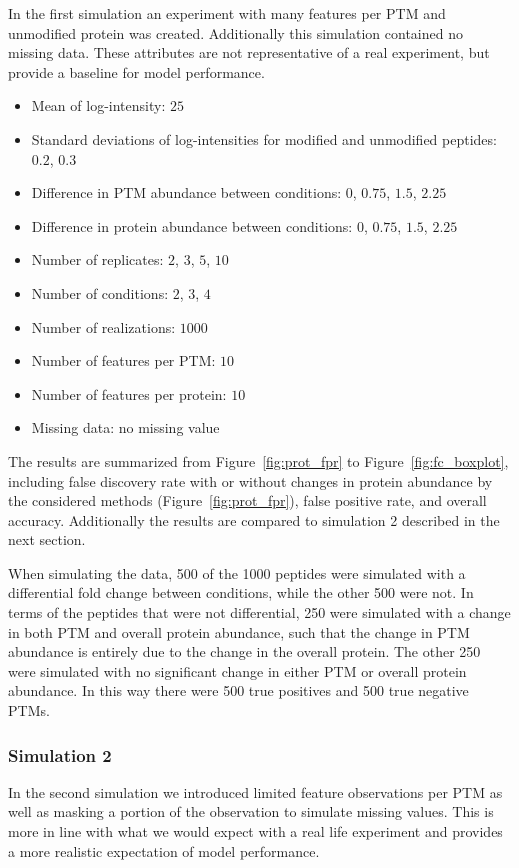 \documentclass{mcp}
\def\sfigref#1{{Figure~\ref{#1}}}
\begin{document}
In the first simulation an experiment with many features per PTM and unmodified protein was created. Additionally this simulation contained no missing data. These attributes are not representative of a real experiment, but provide a baseline for model performance.

\begin{itemize}
\item Mean of log-intensity: $25$
\item Standard deviations of log-intensities for modified and unmodified peptides: $0.2$, $0.3$
\item Difference in PTM abundance between conditions: $0$, $0.75$, $1.5$, $2.25$
\item Difference in protein abundance between conditions: $0$, $0.75$, $1.5$, $2.25$
\item Number of replicates: $2$, $3$, $5$, $10$
\item Number of conditions: $2$, $3$, $4$
\item Number of realizations: $1000$
\item Number of features per PTM: $10$
\item Number of features per protein: $10$
\item Missing data: no missing value
\end{itemize}

The results are summarized from \sfigref{fig:prot_fpr} to \sfigref{fig:fc_boxplot}, including false discovery rate with or without changes in protein abundance by the considered methods (\sfigref{fig:prot_fpr}), false positive rate, and overall accuracy. Additionally the results are compared to simulation 2 described in the next section.

When simulating the data, 500 of the 1000 peptides were simulated with a differential fold change between conditions, while the other 500 were not. In terms of the peptides that were not differential, 250 were simulated with a change in both PTM and overall protein abundance, such that the change in PTM abundance is entirely due to the change in the overall protein. The other 250 were simulated with no significant change in either PTM or overall protein abundance. In this way there were 500 true positives and 500 true negative PTMs.

\subsubsection{Simulation 2}

In the second simulation we introduced limited feature observations per PTM as well as masking a portion of the observation to simulate missing values. This is more in line with what we would expect with a real life experiment and provides a more realistic expectation of model performance.
\end{document}
